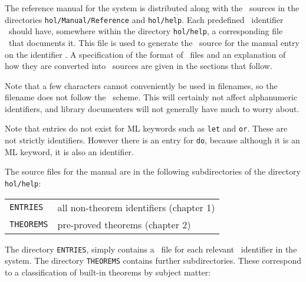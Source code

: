 The reference manual for the system is distributed along with the \HOL\ sources
in the directories {\tt hol/Manual/Reference} and {\tt hol/help}.  Each
predefined \ML\ identifier \id\ should have, somewhere within the directory
{\tt hol/help}, a corresponding file \id\doc\ that documents it. This file is
used to generate the \latex\ source for the manual entry on the identifier \id.
A specification of the format of \id\doc\ files and an explanation of how they
are converted into \latex\ sources are given in the sections that follow.

Note that a few characters cannot conveniently be used in filenames, so
the filename does not follow the \id\doc\ scheme. This will certainly not
affect alphanumeric identifiers, and library documenters will not generally
have much to worry about.

Note that entries do not exist for ML keywords such as {\tt let} and {\tt or}.
These are not strictly identifiers. However there is an entry for {\tt do},
because although it is an ML keyword, it is also an identifier.

The source files for the manual are in the following subdirectories of the
directory {\tt hol/help}:

\vspace*{4mm plus2mm minus2mm}

\noindent\begin{tabular}{@{\qquad}l@{\hskip4mm ---\hskip4mm}l@{}}

   {\tt ENTRIES}   & all non-theorem identifiers (chapter 1)\\
   {\tt THEOREMS}  & pre-proved theorems (chapter 2)

\end{tabular}

\vspace*{4mm plus2mm minus2mm}

\noindent The directory {\tt ENTRIES}, simply contains a \doc\ file for each
relevant \ML\ identifier in the system.  The directory {\tt THEOREMS} contains
further subdirectories.  These correspond to a classification of built-in
theorems by subject matter:

\vspace*{4mm plus2mm minus2mm}

